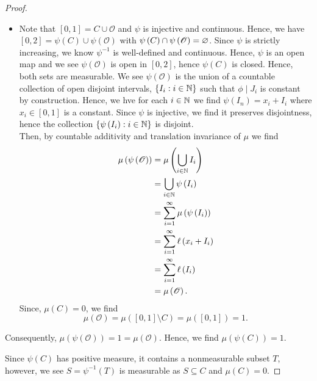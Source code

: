 \begin{proof}
	\begin{itemize}
		\item Note that \(\left[ 0, 1 \right]  = C \cup \mathscr{O}\) and \(\psi\) is injective and continuous. Hence, we have \(\left[ 0, 2 \right] = \psi\left( C \right)  \cup \psi \left( \mathscr{O} \right) \) with \(\psi\left( C \right)  \cap \psi\left( \mathscr{O} \right)  = \varnothing\). Since \(\psi\) is strictly increasing, we know \(\psi^{-1}\) is well-defined and continuous. Hence, \(\psi\) is an open map and we see \(\psi\left( \mathscr{O} \right) \) is open in \(\left[ 0, 2 \right] \), hence \(\psi\left( C \right) \) is closed. Hence, both sets are measurable. We see \(\psi\left( \mathscr{O} \right) \) is the  union of a countable collection of open disjoint intervals, \(\{I_{i} : i \in \mathbb{N}\} \) such that \(\phi \mid J_{i}\) is constant by construction. Hence, we hve for each \( i \in \mathbb{N}\) we find \(\psi\left( I_{n} \right) = x_{i} + I_{i}\) where \(x_{i} \in \left[ 0, 1 \right] \) is a constant. Since \(\psi\) is injective, we find it preserves disjointness, hence the collection \(\{\psi \left( I_{i} \right) : i \in \mathbb{N}\} \) is disjoint.\\
		Then, by countable additivity and translation invariance of \(\mu\) we find
		\begin{align*}
			\mu \left( \psi\left( \mathscr{O} \right)  \right) &= \mu\left( \bigcup_{i \in \mathbb{N}} I_{i} \right)  \\
									   &=  \bigcup_{ i \in \mathbb{N}} \psi\left( I_{i} \right)  \\
									   &= \sum_{i= 1}^{\infty} \mu\left( \psi\left( I_{i} \right)  \right)  \\
									   &= \sum_{i= 1}^{\infty} \ell\left( x_{i} + I_{i} \right)  \\
									   &= \sum_{i=1}^{\infty} \ell\left( I_{i} \right)  \\
									   &= \mu\left( \mathscr{O} \right)
		.\end{align*}
		Since, \( \mu\left( C \right) = 0\), we find \[
			\mu \left( \mathscr{O} \right)  = \mu\left( \left[ 0, 1 \right] \setminus C \right)  = \mu\left( \left[ 0, 1 \right]  \right)  = 1
		.\]
	\end{itemize}
	Consequently, \( \mu\left( \psi\left( \mathscr{O} \right)  \right)  = 1 = \mu\left( \mathscr{O} \right) \). Hence, we find \( \mu\left( \psi\left( C \right)  \right)  = 1\).
\item Since \(\psi\left( C \right) \) has positive measure, it contains a nonmeasurable subset \(T\), however, we see \(S = \psi^{-1}\left( T \right) \) is measurable as \(S \subseteq C\) and \(\mu\left( C \right)  = 0\).
\end{proof}
